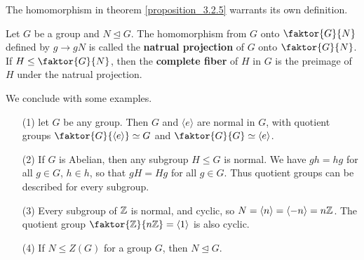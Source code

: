 The homomorphism in theorem \ref{proposition_3.2.5} warrants its own definition.

\begin{definition}
  Let $G$ be a group and  $N \unlhd G$. The homomorphism from $G$ onto
  $\faktor{G}{N}$ defined by $g \rightarrow gN$ is called the \textbf{natrual
  projection} of $G$ onto  $\faktor{G}{N}$. If $H \leq \faktor{G}{N}$, then
  the \textbf{complete fiber} of $H$ in  $G$ is the preimage of $H$ under the
  natrual projection.
\end{definition}

We conclude with some examples.

\begin{example}\label{example_3.4}
  \begin{enumerate}
    \item[(1)] let $G$ be any group. Then $G$ and $\langle e \rangle$ are normal
      in $G$, with quotient groups $\faktor{G}{\langle e \rangle} \simeq G$ and
      $\faktor{G}{G} \simeq \langle e \rangle$.

    \item[(2)] If $G$ is Abelian, then any subgroup  $H \leq G$ is normal.
      We have  $gh=hg$ for all  $g \in G$,  $h \in h$, so that  $gH=Hg$
      for all  $g \in G$. Thus quotient groups can be described for every
      subgroup.

    \item [(3)] Every subgroup of $\mathbb{Z}$ is normal, and cyclic, so
      $N=\langle n \rangle=\langle -n \rangle=n\mathbb{Z}$. The quotient group
      $\faktor{\Z}{n\Z}=\langle 1 \rangle$ is also cyclic.

    \item[(4)] If $N \leq Z(G)$ for a group $G$, then  $N \unlhd G$.
  \end{enumerate}
\end{example}
